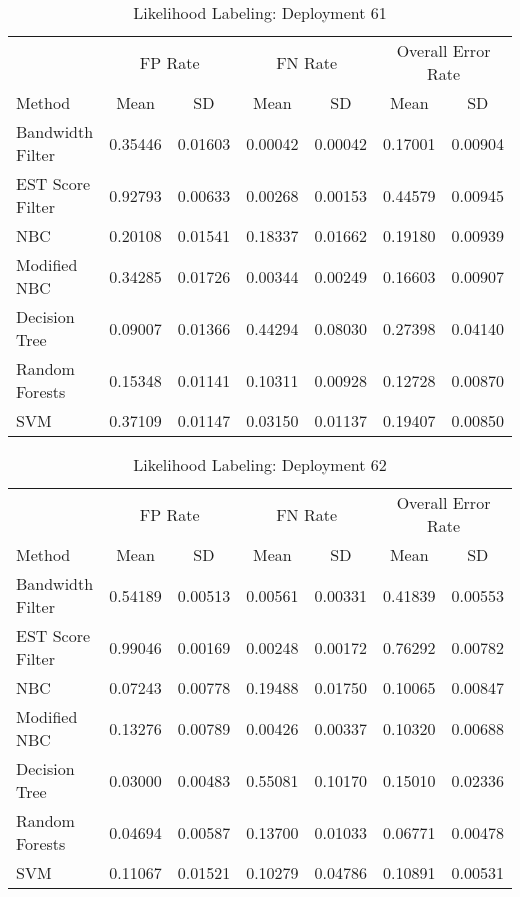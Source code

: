 \documentclass[twoside]{article}
\begin{document}
\begin{table}[H]
\caption{Likelihood Labeling: Deployment 61}
\centering
\begin{tabular}{lcccccc}
\toprule
\multicolumn{1}{c}{ } 
&\multicolumn{2}{c}{FP Rate } 
&\multicolumn{2}{c}{FN Rate } 
&\multicolumn{2}{c}{Overall Error Rate } \\
\cmidrule(r){2-3}
\cmidrule(r){4-5}
\cmidrule(r){6-7}
Method& Mean & SD & Mean & SD & Mean & SD \\
\midrule
Bandwidth Filter & 0.35446 & 0.01603 & 0.00042 & 0.00042 & 0.17001 & 0.00904 \\
EST Score Filter & 0.92793 & 0.00633 & 0.00268 & 0.00153 & 0.44579 & 0.00945 \\
NBC & 0.20108 & 0.01541 & 0.18337 & 0.01662 & 0.19180 & 0.00939 \\
Modified NBC & 0.34285 & 0.01726 & 0.00344 & 0.00249 & 0.16603 & 0.00907 \\
Decision Tree & 0.09007 & 0.01366 & 0.44294 & 0.08030 & 0.27398 & 0.04140 \\
Random Forests & 0.15348 & 0.01141 & 0.10311 & 0.00928 & 0.12728 & 0.00870 \\
SVM & 0.37109 & 0.01147 & 0.03150 & 0.01137 & 0.19407 & 0.00850 \\
\bottomrule
\end{tabular}
\end{table}

\begin{table}[H]
\caption{Likelihood Labeling: Deployment 62}
\centering
\begin{tabular}{lcccccc}
\toprule
\multicolumn{1}{c}{ } 
&\multicolumn{2}{c}{FP Rate } 
&\multicolumn{2}{c}{FN Rate } 
&\multicolumn{2}{c}{Overall Error Rate } \\
\cmidrule(r){2-3}
\cmidrule(r){4-5}
\cmidrule(r){6-7}
Method& Mean & SD & Mean & SD & Mean & SD \\
\midrule
Bandwidth Filter & 0.54189 & 0.00513 & 0.00561 & 0.00331 & 0.41839 & 0.00553 \\
EST Score Filter & 0.99046 & 0.00169 & 0.00248 & 0.00172 & 0.76292 & 0.00782 \\
NBC & 0.07243 & 0.00778 & 0.19488 & 0.01750 & 0.10065 & 0.00847 \\
Modified NBC & 0.13276 & 0.00789 & 0.00426 & 0.00337 & 0.10320 & 0.00688 \\
Decision Tree & 0.03000 & 0.00483 & 0.55081 & 0.10170 & 0.15010 & 0.02336 \\
Random Forests & 0.04694 & 0.00587 & 0.13700 & 0.01033 & 0.06771 & 0.00478 \\
SVM & 0.11067 & 0.01521 & 0.10279 & 0.04786 & 0.10891 & 0.00531 \\
\bottomrule
\end{tabular}
\end{table}
\end{document}
